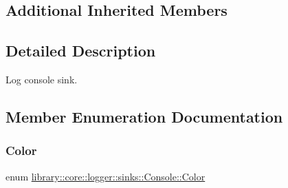 \subsection*{Additional Inherited Members}


\subsection{Detailed Description}
Log console sink. 

\subsection{Member Enumeration Documentation}
\mbox{\label{classlibrary_1_1core_1_1logger_1_1sinks_1_1Console_aa7a07d8165e1df74ad4d289d5220bc96}} 
\subsubsection{\texorpdfstring{Color}{Color}}
{\footnotesize\ttfamily enum \hyperlink{classlibrary_1_1core_1_1logger_1_1sinks_1_1Console_aa7a07d8165e1df74ad4d289d5220bc96}{library\+::core\+::logger\+::sinks\+::\+Console\+::\+Color}\hspace{0.3cm}{\ttfamily [strong]}}

